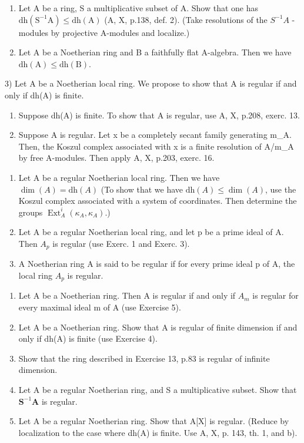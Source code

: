 
\begin{enumerate}
\def\labelenumi{\arabic{enumi})}
\item
  Let A be a ring, S a multiplicative subset of A. Show that one has \(\mathrm{dh}(\mathrm{S}^{-1}\mathrm{A}) \leqslant \mathrm{dh}(\mathrm{A})\) (A, X, p.138, def. 2). (Take resolutions of the \(S^{-1}A\) -modules by projective A-modules and localize.)
\item
  Let A be a Noetherian ring and B a faithfully flat A-algebra. Then we have \(\mathrm{dh(A)}\leqslant \mathrm{dh(B)}\).
\end{enumerate}

3) Let A be a Noetherian local ring. We propose to show that A is regular if and only if dh(A) is finite.

\begin{enumerate}
\def\labelenumi{\alph{enumi})}
\tightlist
\item
  Suppose dh(A) is finite. To show that A is regular, use A, X, p.208, exerc. 13.
\item
  Suppose A is regular. Let x be a completely secant family generating m\_A. Then, the Koszul complex associated with x is a finite resolution of A/m\_A by free A-modules. Then apply A, X, p.203, exerc. 16.
\end{enumerate}

\begin{enumerate}
\def\labelenumi{\arabic{enumi})}
\setcounter{enumi}{3}
\item
  Let A be a regular Noetherian local ring. Then we have \(\dim(A) = \mathrm{dh}(A)\) (To show that we have \(\mathrm{dh}(A) \leqslant \dim(A)\), use the Koszul complex associated with a system of coordinates. Then determine the groups \(\operatorname{Ext}_{A}^{i}(\kappa_{A}, \kappa_{A})\).)
\item
  Let A be a regular Noetherian local ring, and let p be a prime ideal of A. Then \(A_{p}\) is regular (use Exerc. 1 and Exerc. 3).
\item
  A Noetherian ring A is said to be regular if for every prime ideal p of A, the local ring \(A_{p}\) is regular.
\end{enumerate}

\begin{enumerate}
\def\labelenumi{\alph{enumi})}
\item
  Let A be a Noetherian ring. Then A is regular if and only if \(A_{m}\) is regular for every maximal ideal m of A (use Exercise 5).
\item
  Let A be a Noetherian ring. Show that A is regular of finite dimension if and only if dh(A) is finite (use Exercise 4).
\item
  Show that the ring described in Exercise 13, p.83 is regular of infinite dimension.
\item
  Let A be a regular Noetherian ring, and S a multiplicative subset. Show that \(\mathbf{S}^{-1}\mathbf{A}\) is regular.
\item
  Let A be a regular Noetherian ring. Show that A{[}X{]} is regular. (Reduce by localization to the case where dh(A) is finite. Use A, X, p. 143, th. 1, and b).
\end{enumerate}


